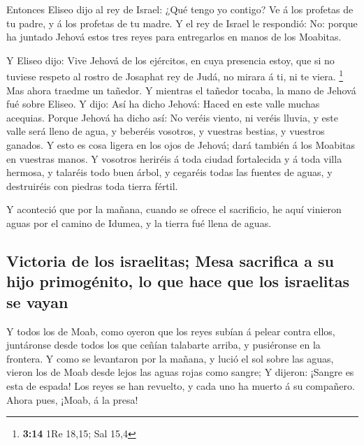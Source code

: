  Entonces Eliseo dijo al rey de Israel: ¿Qué tengo yo
contigo? Ve á los profetas de tu padre, y á los profetas de tu madre. Y
el rey de Israel le respondió: No: porque ha juntado Jehová estos tres
reyes para entregarlos en manos de los Moabitas.

 Y Eliseo dijo: Vive Jehová de los ejércitos, en cuya
presencia estoy, que si no tuviese respeto al rostro de Josaphat rey de
Judá, no mirara á ti, ni te viera. \footnote{\textbf{3:14} 1Re 18,15;
  Sal 15,4}  Mas ahora traedme un tañedor. Y mientras el
tañedor tocaba, la mano de Jehová fué sobre Eliseo.  Y
dijo: Así ha dicho Jehová: Haced en este valle muchas acequias.
 Porque Jehová ha dicho así: No veréis viento, ni veréis
lluvia, y este valle será lleno de agua, y beberéis vosotros, y vuestras
bestias, y vuestros ganados.  Y esto es cosa ligera en los
ojos de Jehová; dará también á los Moabitas en vuestras manos.
 Y vosotros heriréis á toda ciudad fortalecida y á toda
villa hermosa, y talaréis todo buen árbol, y cegaréis todas las fuentes
de aguas, y destruiréis con piedras toda tierra fértil.

 Y aconteció que por la mañana, cuando se ofrece el
sacrificio, he aquí vinieron aguas por el camino de Idumea, y la tierra
fué llena de aguas.

\hypertarget{victoria-de-los-israelitas-mesa-sacrifica-a-su-hijo-primoguxe9nito-lo-que-hace-que-los-israelitas-se-vayan}{%
\subsection{Victoria de los israelitas; Mesa sacrifica a su hijo
primogénito, lo que hace que los israelitas se
vayan}\label{victoria-de-los-israelitas-mesa-sacrifica-a-su-hijo-primoguxe9nito-lo-que-hace-que-los-israelitas-se-vayan}}

 Y todos los de Moab, como oyeron que los reyes subían á
pelear contra ellos, juntáronse desde todos los que ceñían talabarte
arriba, y pusiéronse en la frontera.  Y como se levantaron
por la mañana, y lució el sol sobre las aguas, vieron los de Moab desde
lejos las aguas rojas como sangre;  Y dijeron: ¡Sangre es
esta de espada! Los reyes se han revuelto, y cada uno ha muerto á su
compañero. Ahora pues, ¡Moab, á la presa!

